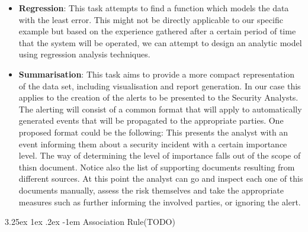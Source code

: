 \documentclass[12pt]{article}
\makeatletter
\newcounter{subsubsubsection}[subsubsection]
\renewcommand\paragraph{\@startsection{paragraph}{5}{\z@}%
  {3.25ex \@plus1ex \@minus.2ex}%
  {-1em}%
  {\normalfont\normalsize\bfseries}}
\makeatother
\begin{document}
\begin{itemize}
\item
\textbf{Regression}: This task attempts to find a function which models the data with the least error.
This might not be directly applicable to our specific example but based on the experience
gathered after a certain period of time that the system will be operated, we can attempt to
design an analytic model using regression analysis techniques.
\item
\textbf{Summarisation}: This task aims to provide a more compact representation of the data set, including visualisation and report generation. In our case this applies to the creation of the alerts to be presented to the Security Analysts. The alerting will consist of a common format that will apply to automatically generated events that will be propagated to the appropriate parties. One proposed format could be the following:
This presents the analyst with an event informing them about a security incident with a certain importance level. The way of determining the level of importance falls out of the scope of thisn document. Notice also the list of supporting documents resulting from different sources. At this point the analyst can go and inspect each one of this documents manually, assess the risk themselves and take the appropriate measures such as further informing the involved parties, or ignoring the alert.
\end{itemize}
\paragraph{Association Rule}(TODO)
\end{document}
